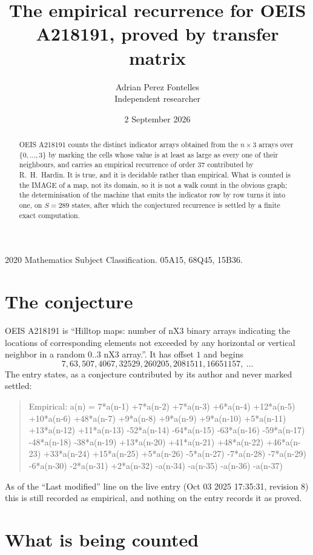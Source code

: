 \documentclass[11pt,a4paper]{article}
\title{The empirical recurrence for OEIS A218191, proved by transfer matrix}
\author{Adrian Perez Fontelles\\ \small Independent researcher}
\date{2 September 2026}
\theoremstyle{plain}
\theoremstyle{definition}
\begin{document}
\maketitle

\begin{abstract}
OEIS A218191 counts the distinct indicator arrays obtained from the $n\times3$ arrays over
$\{0,\dots,3\}$ by marking the cells whose value is at least as large as every one of their neighbours, and carries an
empirical recurrence of order $37$ contributed by R.~H.~Hardin. It is true, and it is
decidable rather than empirical. What is counted is the IMAGE of a map, not its domain, so it
is not a walk count in the obvious graph; the determinisation of the machine that emits the
indicator row by row turns it into one, on $S=289$ states, after which the conjectured
recurrence is settled by a finite exact computation.
\end{abstract}

\noindent\small 2020 Mathematics Subject Classification. 05A15, 68Q45, 15B36.\normalsize

\section{The conjecture}

OEIS A218191 is ``Hilltop maps: number of nX3 binary arrays indicating the locations of corresponding elements not exceeded by any horizontal or vertical neighbor in a random 0..3 nX3 array.''. It has offset $1$ and begins
\[
7, 63, 507, 4067, 32529, 260205, 2081511, 16651157,\ \dots
\]
The entry states, as a conjecture contributed by its author and never marked settled:
\begin{quote}
Empirical: a(n) = 7*a(n-1) +7*a(n-2) +7*a(n-3) +6*a(n-4) +12*a(n-5) +10*a(n-6) +48*a(n-7) +9*a(n-8) +9*a(n-9) +9*a(n-10) +5*a(n-11) +13*a(n-12) +11*a(n-13) -52*a(n-14) -64*a(n-15) -63*a(n-16) -59*a(n-17) -48*a(n-18) -38*a(n-19) +13*a(n-20) +41*a(n-21) +48*a(n-22) +46*a(n-23) +33*a(n-24) +15*a(n-25) +5*a(n-26) -5*a(n-27) -7*a(n-28) -7*a(n-29) -6*a(n-30) -2*a(n-31) +2*a(n-32) -a(n-34) -a(n-35) -a(n-36) -a(n-37)
\end{quote}
As of the ``Last modified'' line on the live entry (Oct 03 2025 17:35:31, revision 8) this is still
recorded as empirical, and nothing on the entry records it as proved.

\section{What is being counted}
\end{document}
